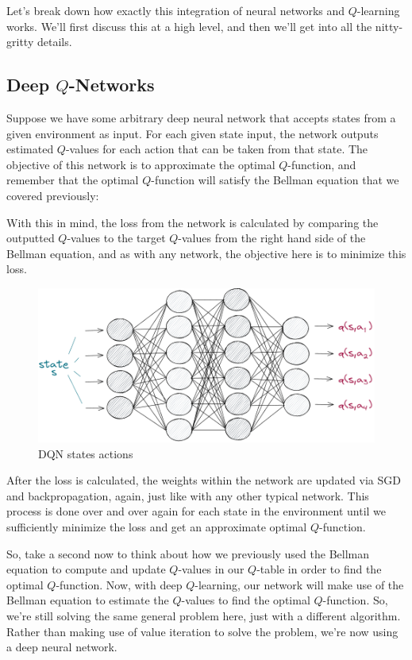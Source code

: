Let's break down how exactly this integration of neural networks and $Q$-learning works. 
We'll first discuss this at a high level, and then we'll get into all the nitty-gritty 
details.


\subsection{Deep $Q$-Networks}

Suppose we have some arbitrary deep neural network that accepts states from a given 
environment as input. For each given state input, the network outputs estimated $Q$-values 
for each action that can be taken from that state. The objective of this network is to 
approximate the optimal $Q$-function, and remember that the optimal $Q$-function will 
satisfy the Bellman equation that we covered previously:

With this in mind, the loss from the network is calculated by comparing the outputted 
$Q$-values to the target $Q$-values from the right hand side of the Bellman equation, 
and as with any network, the objective here is to minimize this loss.

\begin{figure}[h]
\centering
\includegraphics[scale=0.618]{pix/q_learning/q_network.png}
\caption{DQN states actions}
\end{figure}

After the loss is calculated, the weights within the network are updated via SGD and 
backpropagation, again, just like with any other typical network. This process is done 
over and over again for each state in the environment until we sufficiently minimize 
the loss and get an approximate optimal $Q$-function.

So, take a second now to think about how we previously used the Bellman equation to 
compute and update $Q$-values in our $Q$-table in order to find the optimal $Q$-function. 
Now, with deep $Q$-learning, our network will make use of the Bellman equation to estimate 
the $Q$-values to find the optimal $Q$-function. So, we're still solving the same general 
problem here, just with a different algorithm. Rather than making use of value iteration 
to solve the problem, we're now using a deep neural network.

